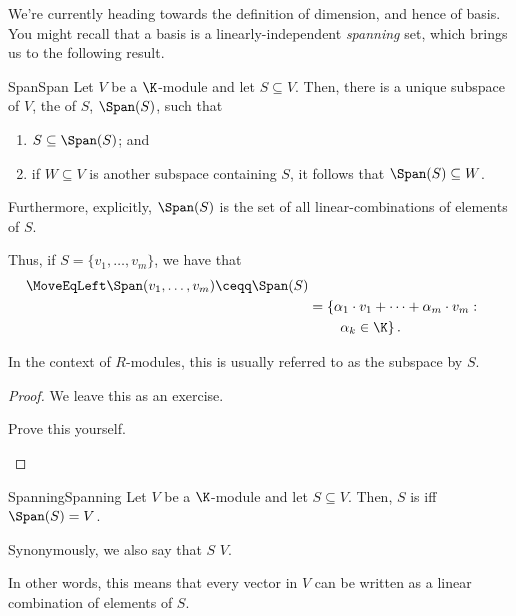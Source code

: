 We're currently heading towards the definition of dimension, and hence of basis.  You might recall that a basis is a linearly-independent \emph{spanning} set, which brings us to the following result.
\begin{thm}{Span}{Span}
	Let $V$ be a $\K$-module and let $S\subseteq V$.  Then, there is a unique subspace of $V$, the  of $S$, $\Span (S)$, such that
	\begin{enumerate}
		\item $S\subseteq \Span (S)$; and
		\item if $W\subseteq V$ is another subspace containing $S$, it follows that $\Span (S)\subseteq W$.
	\end{enumerate}
	Furthermore, explicitly, $\Span (S)$ is the set of all linear-combinations of elements of $S$.
	\begin{rmk}
		Thus, if $S=\{ v_1,\ldots ,v_m\}$, we have that
		\begin{equation}
		\begin{split}
		\MoveEqLeft
		\Span (v_1,\ldots ,v_m)\ceqq \Span (S) \\
		& =\left\{ \alpha _1\cdot v_1+\cdots +\alpha _m\cdot v_m:\right. \\ & \qquad \left. \alpha _k\in \K \right\} .
		\end{split}
		\end{equation}
	\end{rmk}
	\begin{rmk}
		In the context of $R$-modules, this is usually referred to as the subspace  by $S$.
	\end{rmk}
	\begin{proof}
		We leave this as an exercise.
		\begin{exr}[breakable=false]{}{}
			Prove this yourself.
		\end{exr}
	\end{proof}
\end{thm}
\begin{dfn}{Spanning}{Spanning}
	Let $V$ be a $\K$-module and let $S\subseteq V$.  Then, $S$ is  iff $\Span (S)=V$.
	\begin{rmk}
		Synonymously, we also say that $S$  $V$.
	\end{rmk}
	\begin{rmk}
		In other words, this means that every vector in $V$ can be written as a linear combination of elements of $S$.
	\end{rmk}
\end{dfn}
